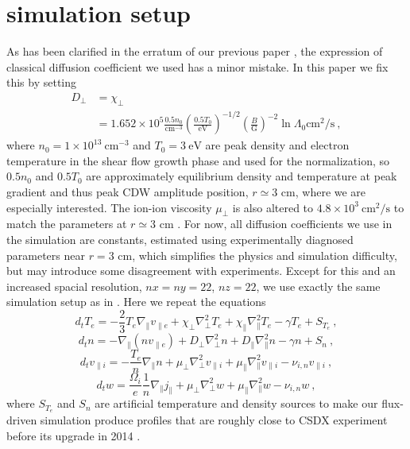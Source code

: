 \documentclass[aps,pre,twocolumn,superscriptaddress]{revtex4-2}
\begin{document}
\section{\label{simulation setup} simulation setup}
As has been clarified in the erratum \cite{Lang_2020} of our previous paper \cite{Lang_2019}, the expression of classical diffusion coefficient we used has a minor mistake. In this paper we fix this by setting
\begin{equation}
\begin{aligned}
	D_{\perp}&=\chi_{\perp} \\
	&=1.652\times 10^5\frac{0.5n_0}{\mathrm{cm^{-3}}}
	\left(\frac{0.5T_{0}}{\mathrm{eV}}\right)^{-1/2}
	\left(\frac{B}{\mathrm{G}}\right)^{-2}\ln\Lambda_{0}\mathrm{cm^2/s}~,
\end{aligned}
\end{equation}
where $n_0=1\times 10^{13}\ \mathrm{cm^{-3}}$ and $T_0=3\ \mathrm{eV}$ are peak density and electron temperature in the shear flow growth phase and used for the normalization, so $0.5n_0$ and $0.5T_0$ are approximately equilibrium density and temperature at peak gradient and thus peak CDW amplitude position, $r\simeq3$ cm, where we are especially interested. The ion-ion viscosity $\mu_{\perp}$ is also altered to $4.8\times10^3\ \mathrm{cm^2/s}$ to match the parameters at $r\simeq 3$ cm \cite{Vaezi_2017U}. For now, all diffusion coefficients we use in the simulation are constants, estimated using experimentally diagnosed parameters near $r=3$ cm, which simplifies the physics and simulation difficulty, but may introduce some disagreement with experiments. Except for this and an increased spacial resolution, $nx=ny=22$, $nz=22$, we use exactly the same simulation setup as in \cite{Lang_2019}. Here we repeat the equations
\begin{equation}
d_{t}T_{e}
=-\frac{2}{3}T_{e}\nabla_{\parallel}v_{\parallel e}
+\chi_{\perp}\nabla_{\perp}^{2}T_{e}+\chi_{\parallel}\nabla_{\parallel}^{2}T_{e}
-\gamma T_{e}+S_{T_{e}}~,
\label{Te}
\end{equation}
\begin{equation}
d_{t}n
=-\nabla_{\parallel}\left(nv_{\parallel e}\right)
+D_{\perp}\nabla_{\perp}^{2}n+D_{\parallel}\nabla_{\parallel}^{2}n
-\gamma n+S_{n}~,
\label{den}
\end{equation}
\begin{equation}
d_{t}v_{\parallel i}
=-\frac{T_{e}}{n}\nabla_{\parallel}n
+\mu_{\perp}\nabla_{\perp}^{2}v_{\parallel i}
+\mu_{\parallel}\nabla_{\parallel}^{2}v_{\parallel i}
-\nu_{i,n} v_{\parallel i}~,
\label{vi}
\end{equation}
\begin{equation}
d_{t}w
=\frac{\Omega_i}{e}\frac{1}{n}\nabla_{\parallel}j_{\parallel}
+\mu_{\perp}\nabla_{\perp}^{2}w+\mu_{\parallel}\nabla_{\parallel}^{2}w
-\nu_{i,n} w~,
\label{w}
\end{equation}
where $S_{T_e}$ and $S_n$ are artificial temperature and density sources to make our flux-driven simulation produce profiles that are roughly close to CSDX experiment \cite{Tynan_2009} before its upgrade in 2014 \cite{Thakur_2014} .
\end{document}
